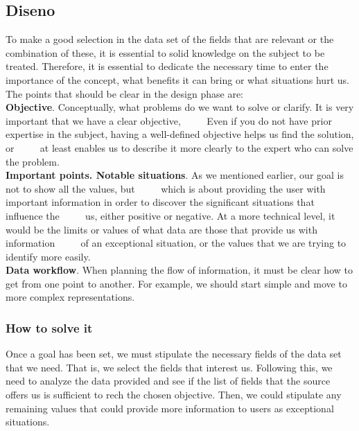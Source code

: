 \subsection{Diseno}
To make a good selection in the data set of the fields that are relevant or the combination of these, it is essential to
solid knowledge on the subject to be treated. Therefore, it is essential to dedicate the necessary time to enter the
importance of the concept, what benefits it can bring or what situations hurt us.
The points that should be clear in the design phase are: \\

\textbf{Objective}. Conceptually, what problems do we want to solve or clarify. It is very important that we have a clear objective,
     Even if you do not have prior expertise in the subject, having a well-defined objective helps us find the solution, or
     at least enables us to describe it more clearly to the expert who can solve the problem. \\

\textbf{Important points. Notable situations}. As we mentioned earlier, our goal is not to show all the values, but
     which is about providing the user with important information in order to discover the significant situations that influence the
     us, either positive or negative. At a more technical level, it would be the limits or values of what data are those that provide us with information
     of an exceptional situation, or the values that we are trying to identify more easily. \\

\textbf{Data workflow}. When planning the flow of information, it must be clear how to get from one point to another. For example, we should start simple and move to more complex representations.

\subsubsection{How to solve it} 
Once a goal has been set, we must stipulate the necessary fields of the data set that we need. That is, we select the fields that interest us. Following this, we need to analyze the data provided and see if the list of fields that the source offers us is sufficient to rech the chosen objective.
Then, we could stipulate any remaining values that could provide more information to users as exceptional situations.

